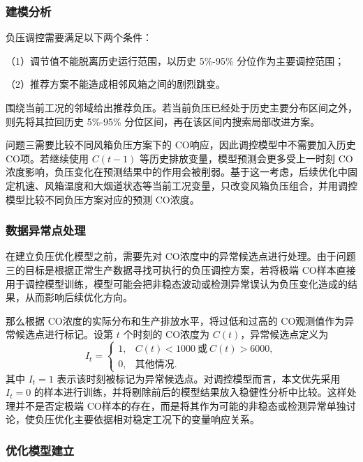 \documentclass[UTF8,a4paper,zihao=-4]{ctexart}
\newcommand{\CO}{CO}
\begin{document}
\subsubsection{建模分析}

负压调控需要满足以下两个条件：

（1）调节值不能脱离历史运行范围，以历史 5\%-95\% 分位作为主要调控范围；

（2）推荐方案不能造成相邻风箱之间的剧烈跳变。

围绕当前工况的邻域给出推荐负压。若当前负压已经处于历史主要分布区间之外，则先将其拉回历史 5\%-95\% 分位区间，再在该区间内搜索局部改进方案。

问题三需要比较不同风箱负压方案下的 \CO 响应，因此调控模型中不需要加入历史 \CO 项。若继续使用 $C(t-1)$ 等历史排放变量，模型预测会更多受上一时刻 \CO 浓度影响，负压变化在预测结果中的作用会被削弱。基于这一考虑，后续优化中固定机速、风箱温度和大烟道状态等当前工况变量，只改变风箱负压组合，并用调控模型比较不同负压方案对应的预测 \CO 浓度。

\subsubsection{数据异常点处理}

在建立负压优化模型之前，需要先对 \CO 浓度中的异常候选点进行处理。由于问题三的目标是根据正常生产数据寻找可执行的负压调控方案，若将极端 \CO 样本直接用于调控模型训练，模型可能会把非稳态波动或检测异常误认为负压变化造成的结果，从而影响后续优化方向。

那么根据 \CO 浓度的实际分布和生产排放水平，将过低和过高的 \CO 观测值作为异常候选点进行标记。设第 $t$ 个时刻的 \CO 浓度为 $C(t)$，异常候选点定义为
\begin{equation}
I_t=
\begin{cases}
1, & C(t)<1000 \ \text{或}\ C(t)>6000,\\
0, & \text{其他情况}.
\end{cases}
\end{equation}
其中 $I_t=1$ 表示该时刻被标记为异常候选点。对调控模型而言，本文优先采用 $I_t=0$ 的样本进行训练，并将剔除前后的模型结果放入稳健性分析中比较。这样处理并不是否定极端 \CO 样本的存在，而是将其作为可能的非稳态或检测异常单独讨论，使负压优化主要依据相对稳定工况下的变量响应关系\cite{openai2026codex}。

\subsubsection{优化模型建立}
\end{document}
